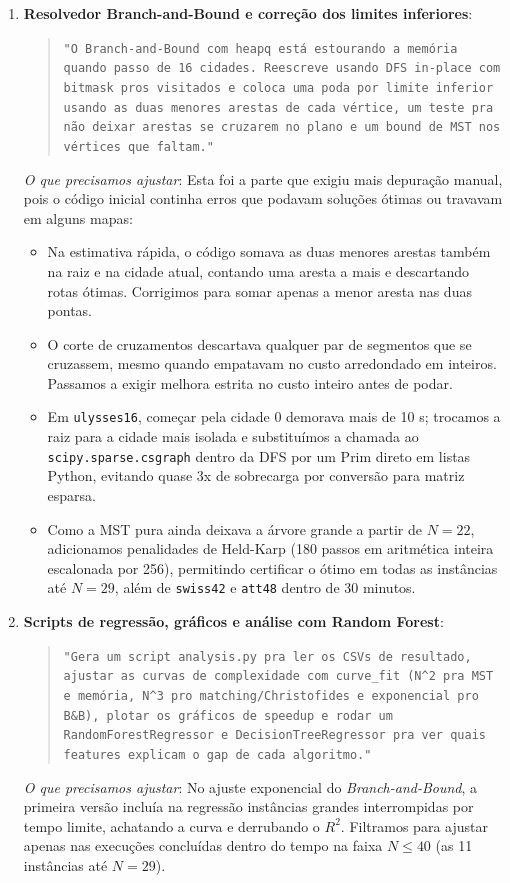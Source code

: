\documentclass[12pt]{article}
\begin{document}
\begin{enumerate}
  \item \textbf{Resolvedor Branch-and-Bound e correção dos limites inferiores}:
  \begin{quote}
  \small\texttt{"O Branch-and-Bound com heapq está estourando a memória quando passo de 16 cidades. Reescreve usando DFS in-place com bitmask pros visitados e coloca uma poda por limite inferior usando as duas menores arestas de cada vértice, um teste pra não deixar arestas se cruzarem no plano e um bound de MST nos vértices que faltam."}
  \end{quote}
  \textit{O que precisamos ajustar}: Esta foi a parte que exigiu mais depuração manual, pois o código inicial continha erros que podavam soluções ótimas ou travavam em alguns mapas:
  \begin{itemize}
    \item Na estimativa rápida, o código somava as duas menores arestas também na raiz e na cidade atual, contando uma aresta a mais e descartando rotas ótimas. Corrigimos para somar apenas a menor aresta nas duas pontas.
    \item O corte de cruzamentos descartava qualquer par de segmentos que se cruzassem, mesmo quando empatavam no custo arredondado em inteiros. Passamos a exigir melhora estrita no custo inteiro antes de podar.
    \item Em \texttt{ulysses16}, começar pela cidade 0 demorava mais de 10 s; trocamos a raiz para a cidade mais isolada e substituímos a chamada ao \texttt{scipy.sparse.csgraph} dentro da DFS por um Prim direto em listas Python, evitando quase 3x de sobrecarga por conversão para matriz esparsa.
    \item Como a MST pura ainda deixava a árvore grande a partir de $N = 22$, adicionamos penalidades de Held-Karp (180 passos em aritmética inteira escalonada por 256), permitindo certificar o ótimo em todas as instâncias até $N = 29$, além de \texttt{swiss42} e \texttt{att48} dentro de 30 minutos.
  \end{itemize}

  \item \textbf{Scripts de regressão, gráficos e análise com Random Forest}:
  \begin{quote}
  \small\texttt{"Gera um script analysis.py pra ler os CSVs de resultado, ajustar as curvas de complexidade com curve\_fit (N\textasciicircum{}2 pra MST e memória, N\textasciicircum{}3 pro matching/Christofides e exponencial pro B\&B), plotar os gráficos de speedup e rodar um RandomForestRegressor e DecisionTreeRegressor pra ver quais features explicam o gap de cada algoritmo."}
  \end{quote}
  \textit{O que precisamos ajustar}: No ajuste exponencial do \textit{Branch-and-Bound}, a primeira versão incluía na regressão instâncias grandes interrompidas por tempo limite, achatando a curva e derrubando o $R^2$. Filtramos para ajustar apenas nas execuções concluídas dentro do tempo na faixa $N \le 40$ (as 11 instâncias até $N = 29$).
\end{enumerate}
\end{document}
